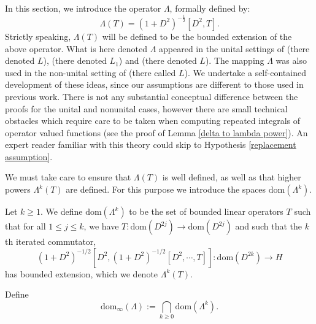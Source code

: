     In this section, we introduce the operator $\Lambda$, formally defined by:
    \begin{equation*}
        \Lambda(T) = (1+D^2)^{-\frac12}[D^2,T].
    \end{equation*}
    Strictly speaking, $\Lambda(T)$ will be defined to be the bounded extension of the above operator. What is here denoted $\Lambda$ appeared in the unital settings of \cite[Appendix B]{Connes-Moscovici} 
    (there denoted $L$), \cite[Definition 6.5]{CPRS2} (there denoted $L_1$) and \cite[Equation 10.66]{GVF} (there denoted $L$).
    The mapping $\Lambda$ was also used in the non-unital setting of \cite[Definition 1.20]{CGRS2} (there called $L$).
    We undertake a self-contained development of these ideas, since our assumptions are different to those used in previous work.
    There is not any substantial conceptual difference between the proofs for the unital and nonunital cases, however there are small technical obstacles which require care to be taken when computing repeated integrals of operator valued functions (see the proof of Lemma \ref{delta to lambda power}). An expert reader familiar with this theory could skip to Hypothesis \ref{replacement assumption}.
    
    We must take care to ensure that $\Lambda(T)$ is well defined, as well as that higher powers $\Lambda^k(T)$ are defined. For this purpose we introduce the spaces $\mathrm{dom}(\Lambda^k)$.    
    \begin{defi}\label{lambda def}
        Let $k \geq 1$. We define $\mathrm{dom}(\Lambda^k)$ to be the set of bounded linear operators $T$ such that for all $1 \leq j \leq k$, we have $T:\mathrm{dom}(D^{2j})\to \mathrm{dom}(D^{2j})$ and 
        such that the $k$th iterated commutator,
        \begin{equation*}
            (1+D^2)^{-1/2}[D^2,(1+D^2)^{-1/2}[D^2,\cdots,T]]:\mathrm{dom}(D^{2k})\to H
        \end{equation*}
        has bounded extension, which we denote $\Lambda^k(T)$.
        
        Define 
        \begin{equation*}
            \mathrm{dom}_\infty(\Lambda) := \bigcap_{k\geq 0} \mathrm{dom}(\Lambda^k).
        \end{equation*}
    \end{defi}


